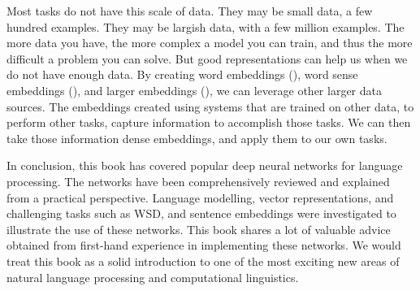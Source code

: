 \documentclass[12pt,parskip]{komatufte}
\begin{document}
Most tasks do not have this scale of data.
They may be small data, a few hundred examples.
They may be largish data, with a few million examples.
The more data you have, the more complex a model you can train,
and thus the more difficult a problem you can solve.
But good representations can help us when we do not have enough data.
By creating word embeddings (),
word sense embeddings (),
and larger embeddings (),
we can leverage other larger data sources.
The embeddings created using systems that are trained on other data, to perform other tasks,
capture information to accomplish those tasks.
We can then take those information dense embeddings, and apply them to our own tasks.

In conclusion,
this book has covered popular deep neural networks for language processing.
The networks have been comprehensively reviewed and explained from a practical perspective.
Language modelling, vector representations, and challenging tasks such as WSD, and sentence embeddings were  investigated to illustrate the use of these networks.
This book shares a lot of valuable advice obtained from first-hand experience in implementing these networks.
We would treat this book as a solid introduction to one of the most exciting new areas of natural language processing and computational linguistics.

\printbib
\end{document}

